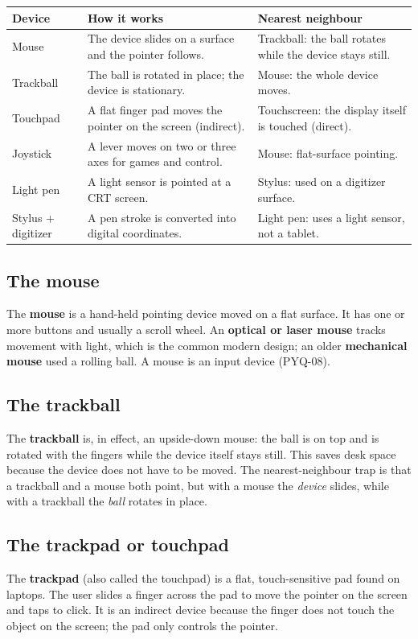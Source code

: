 \documentclass[11pt]{article}
\begin{document}
\begin{center}
\begin{tabular}{p{}p{}p{}}
\toprule
\textbf{Device} & \textbf{How it works} & \textbf{Nearest neighbour} \\
\midrule
Mouse & The device slides on a surface and the pointer follows. & Trackball: the ball rotates while the device stays still. \\
Trackball & The ball is rotated in place; the device is stationary. & Mouse: the whole device moves. \\
Touchpad & A flat finger pad moves the pointer on the screen (indirect). & Touchscreen: the display itself is touched (direct). \\
Joystick & A lever moves on two or three axes for games and control. & Mouse: flat-surface pointing. \\
Light pen & A light sensor is pointed at a CRT screen. & Stylus: used on a digitizer surface. \\
Stylus + digitizer & A pen stroke is converted into digital coordinates. & Light pen: uses a light sensor, not a tablet. \\
\bottomrule
\end{tabular}
\end{center}

\subsection{The mouse}
The \textbf{mouse} is a hand-held pointing device moved on a flat surface. It
has one or more buttons and usually a scroll wheel. An \textbf{optical or
laser mouse} tracks movement with light, which is the common modern design;
an older \textbf{mechanical mouse} used a rolling ball. A mouse is an input
device (PYQ-08).

\subsection{The trackball}
The \textbf{trackball} is, in effect, an upside-down mouse: the ball is on
top and is rotated with the fingers while the device itself stays still. This
saves desk space because the device does not have to be moved. The
nearest-neighbour trap is that a trackball and a mouse both point, but with a
mouse the \emph{device} slides, while with a trackball the \emph{ball}
rotates in place.

\subsection{The trackpad or touchpad}
The \textbf{trackpad} (also called the touchpad) is a flat, touch-sensitive
pad found on laptops. The user slides a finger across the pad to move the
pointer on the screen and taps to click. It is an indirect device because the
finger does not touch the object on the screen; the pad only controls the
pointer.
\end{document}

